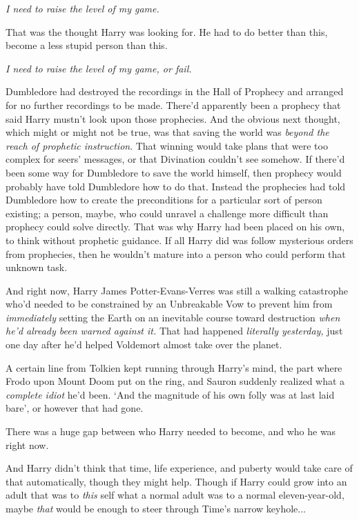 \emph{I need to raise the level of my game.}

That was the thought Harry was looking for. He had to do better than this, become a less stupid person than this.

\emph{I need to raise the level of my game, or fail.}

Dumbledore had destroyed the recordings in the Hall of Prophecy and arranged for no further recordings to be made. There'd apparently been a prophecy that said Harry mustn't look upon those prophecies. And the obvious next thought, which might or might not be true, was that saving the world was \emph{beyond the reach of prophetic instruction}. That winning would take plans that were too complex for seers' messages, or that Divination couldn't see somehow. If there'd been some way for Dumbledore to save the world himself, then prophecy would probably have told Dumbledore how to do that. Instead the prophecies had told Dumbledore how to create the preconditions for a particular sort of person existing; a person, maybe, who could unravel a challenge more difficult than prophecy could solve directly. That was why Harry had been placed on his own, to think without prophetic guidance. If all Harry did was follow mysterious orders from prophecies, then he wouldn't mature into a person who could perform that unknown task.

And right now, Harry James Potter-Evans-Verres was still a walking catastrophe who'd needed to be constrained by an Unbreakable Vow to prevent him from \emph{immediately} setting the Earth on an inevitable course toward destruction \emph{when he'd already been warned against it.} That had happened \emph{literally yesterday,} just one day after he'd helped Voldemort almost take over the planet.

A certain line from Tolkien kept running through Harry's mind, the part where Frodo upon Mount Doom put on the ring, and Sauron suddenly realized what a \emph{complete idiot} he'd been. `And the magnitude of his own folly was at last laid bare', or however that had gone.

There was a huge gap between who Harry needed to become, and who he was right now.

And Harry didn't think that time, life experience, and puberty would take care of that automatically, though they might help. Though if Harry could grow into an adult that was to \emph{this} self what a normal adult was to a normal eleven-year-old, maybe \emph{that} would be enough to steer through Time's narrow keyhole...


